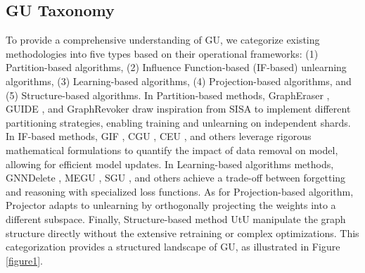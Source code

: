 \subsection{GU Taxonomy}
To provide a comprehensive understanding of GU, we categorize existing methodologies into five types based on their operational frameworks: (1) Partition-based algorithms, (2) Influence Function-based (IF-based) unlearning algorithms, (3) Learning-based algorithms, (4) Projection-based algorithms, and (5) Structure-based algorithms. In Partition-based methods, GraphEraser \cite{chen2022graph_eraser}, GUIDE \cite{wang2023guide}, and GraphRevoker \cite{2024ZhangGraphRevoker} draw inspiration from SISA \cite{2021SISA} to implement different partitioning strategies, enabling training and unlearning on independent shards. In IF-based methods, GIF \cite{wu2023gif}, CGU \cite{chien2022cgu}, CEU \cite{2023WuCEU}, and others \cite{pan2023gst_unlearning,2024IDEA,scaluGUN} leverage rigorous mathematical formulations to quantify the impact of data removal on model, allowing for efficient model updates. In Learning-based algorithms methods, GNNDelete \cite{cheng2023gnndelete}, MEGU \cite{xkliMEGU2024}, SGU \cite{}, and others \cite{2024D2DGN,2023GUKD,2023GCU} achieve a trade-off between forgetting and reasoning with specialized loss functions. As for Projection-based algorithm, Projector \cite{cong2023projector} adapts to unlearning by orthogonally projecting the weights into a different subspace. Finally, Structure-based method UtU \cite{Tan2024UtU} manipulate the graph structure directly without the extensive retraining or complex optimizations. This categorization provides a structured landscape of GU, as illustrated in Figure \ref{figure1}. 


